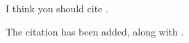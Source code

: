 \reviewersection

\begin{point}
    \label{pt:301}
    I think you should cite \citet{ewers_gis_2023}.
\end{point}

\begin{reply}
    \label{rp:301}
    The citation has been added, along with \citet{ewers_optimal_2023}.
\end{reply}
